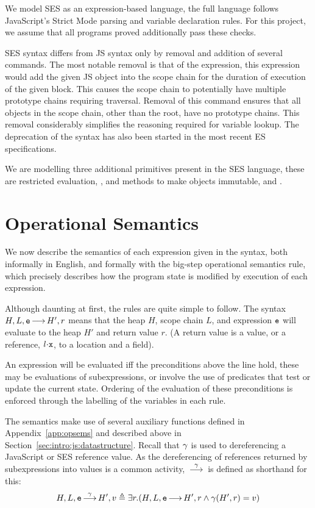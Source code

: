 \documentclass[a4paper,notitlepage]{report}
\begin{document}
  We model SES as an expression-based language, the full language follows
  JavaScript's Strict Mode parsing and variable declaration rules. For this
  project, we assume that all programs proved additionally pass these checks.

  SES syntax differs from JS syntax only by removal and addition of several
  commands. The most notable removal is that of the  expression, this
  expression would add the given JS object into the scope chain for the duration
  of execution of the given block. This causes the scope chain to potentially
  have multiple prototype chains requiring traversal. Removal of this command
  ensures that all objects in the scope chain, other than the root, have no
  prototype chains. This removal considerably simplifies the reasoning required
  for variable lookup. The deprecation of the  syntax has also been
  started in the most recent ES specifications.

  We are modelling three additional primitives present in the SES language,
  these are restricted evaluation, , and methods to make objects
  immutable,  and .

  \section{Operational Semantics}
  \label{sec:opsems}


  We now describe the semantics of each expression given in the syntax, both
  informally in English, and formally with the big-step operational semantics
  rule, which precisely describes how the program state is modified by execution
  of each expression.

  Although daunting at first, the rules are quite simple to follow. The syntax
  $H,L,\mathtt{e} {\,\longrightarrow\,} H',r$ means that the heap $H$, scope chain $L$, and
  expression $\mathtt{e}$ will evaluate to the heap $H'$ and return value $r$. (A
  return value is a value, or a reference, $\fld{l}{\js{x}}$, to a location and
  a field).

  An expression will be evaluated iff the preconditions above the line hold,
  these may be evaluations of subexpressions, or involve the use of predicates
  that test or update the current state.
  Ordering of the evaluation of these preconditions is enforced through the
  labelling of the variables in each rule.

  The semantics make use of several auxiliary functions defined in
  Appendix~\ref{app:opsems} and described above in
  Section~\ref{sec:intro:js:datastructure}. Recall that $\gamma$ is used to
  dereferencing a JavaScript or SES reference value.
  As the dereferencing of references returned by subexpressions into values is a
  common activity, $\overset{\gamma}{{\,\longrightarrow\,}}$ is defined as shorthand for this:
  \[ H,L,\mathtt{e} \overset{\gamma}{{\,\longrightarrow\,}} H',v \triangleq \exists r. (H,L,\mathtt{e} {\,\longrightarrow\,} H',r
  \wedge \gamma(H',r) = v) \]
\end{document}

